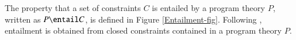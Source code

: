 \documentclass[review]{elsarticle}
\begin{document}
\begin{Definition}
\begin{itemize}


\end{itemize}
\label{program-theory-def}
\end{Definition}



The property that a set of constraints $C$ is entailed by a program
theory $P$, written as $P \entail C$, is defined in Figure
\ref{Entailment-fig}.  Following
\cite{Associated-types-with-class,Associated-type-synonyms},
entailment is obtained from closed constraints contained in a program
theory $P$.

\end{document}
